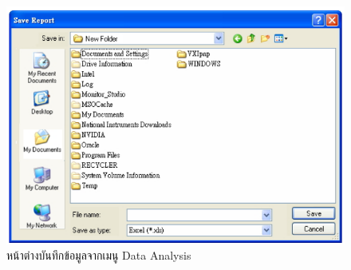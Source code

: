 \begin{center}
\begin{figure}[H]
		\label{fig:Data_analysis_preview}
	\end{figure}
	\begin{figure}[H]
		\includegraphics[width=1\linewidth]{Chapters/img/17020_Program/Report/Export_data_analysis.png}
		\centering
		\captionsetup{justification=centering,margin=2cm}
		\caption{หน้าต่างบันทึกข้อมูลจากเมนู Data Analysis}
		\label{fig:Export_data_analysis}
	\end{figure}
\end{center}
























































